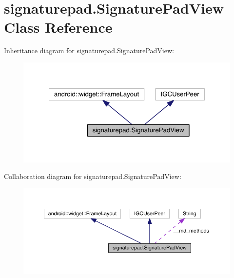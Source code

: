 \hypertarget{classsignaturepad_1_1_signature_pad_view}{\section{signaturepad.\+Signature\+Pad\+View Class Reference}
\label{classsignaturepad_1_1_signature_pad_view}
}


Inheritance diagram for signaturepad.\+Signature\+Pad\+View\+:
\nopagebreak
\begin{figure}[H]
\begin{center}
\leavevmode
\includegraphics[width=322pt]{classsignaturepad_1_1_signature_pad_view__inherit__graph}
\end{center}
\end{figure}


Collaboration diagram for signaturepad.\+Signature\+Pad\+View\+:
\nopagebreak
\begin{figure}[H]
\begin{center}
\leavevmode
\includegraphics[width=350pt]{classsignaturepad_1_1_signature_pad_view__coll__graph}
\end{center}
\end{figure}
